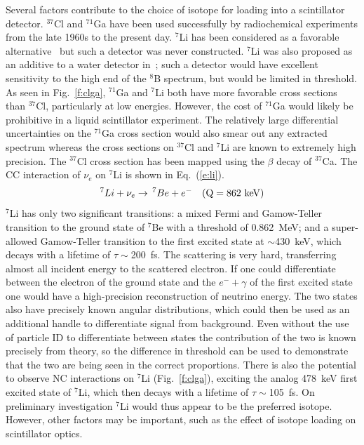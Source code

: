 Several factors contribute to the choice of isotope for loading into a scintillator detector.  $^{37}$Cl and $^{71}$Ga have been used successfully by radiochemical experiments from the late 1960s to the present day.  $^{7}$Li has been considered as a favorable alternative~\cite{rcli} but such a detector was never constructed.  $^{7}$Li was also proposed as an additive to a water detector in~\cite{li}; such a detector would have excellent sensitivity to the high end of the $^8$B spectrum, but would be limited in threshold. 
As seen in Fig.~\ref{f:clga}, $^{71}$Ga and $^{7}$Li both have more favorable cross sections than $^{37}$Cl, particularly at low energies.    However, the cost of $^{71}$Ga would likely be prohibitive in a liquid scintillator experiment.  The relatively large differential uncertainties on the $^{71}$Ga cross section would also smear out any extracted spectrum whereas the cross sections on $^{37}$Cl and $^{7}$Li are known to extremely high precision.  The $^{37}$Cl cross section has been mapped using the $\beta$ decay of $^{37}$Ca.  
The CC interaction of $\nu_e$ on $^{7}$Li is shown in Eq.~(\ref{e:li}).
\begin{equation}\label{e:li}
^{7}Li + \nu_e \rightarrow\, ^{7}Be + e^- \quad \rm{(Q = 862~keV)}
\end{equation}
$^{7}$Li has only two significant transitions: a mixed Fermi and Gamow-Teller transition to the ground state of $^{7}$Be with a threshold of 0.862~MeV; and a super-allowed Gamow-Teller transition to the first excited state at $\sim$430~keV, which decays with a lifetime of $\tau \sim$200~fs.   The scattering is very hard, transferring almost all incident energy to the scattered electron.  If one could differentiate between the electron of the ground state and the $e^- + \gamma$ of the first excited state one would have a high-precision reconstruction of neutrino energy.  The two states also have precisely known angular distributions, which could then be used as an additional handle to differentiate signal from background.  Even without the use of particle ID to differentiate between states the contribution of the two is known precisely from theory, so the difference in threshold can be used to demonstrate that the two are being seen in the correct proportions.
There is also the potential to observe NC interactions on $^{7}$Li (Fig.~\ref{f:clga}), exciting the analog 478~keV first excited state of $^{7}$Li, which then decays with a lifetime of $\tau \sim$105~fs.  On preliminary investigation $^{7}$Li would thus appear to be the preferred isotope.  However, other factors may be important, such as the effect of isotope loading on scintillator optics.

